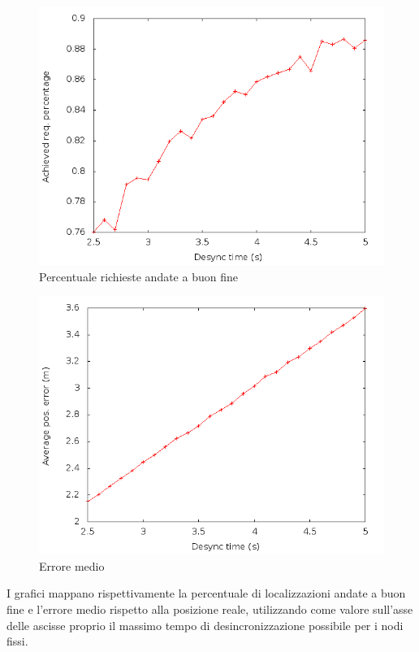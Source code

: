 \begin{figure}[H]
    \centering
    \includegraphics[scale=0.5]{achievedlochexagon6nodescutoff4req3preempt0droponepoint0speed1.png}
    \caption{Percentuale richieste andate a buon fine}
    \label{fig:my_label}
\end{figure}
\begin{figure}[H]
    \centering
    \includegraphics[scale=0.5]{avposerrorhexagon6nodescutoff4req3preempt0droponepoint0speed1.png}
    \caption{Errore medio}
    \label{fig:avposerrorhexagon6nodescutoff4req3preempt0droponepoint0speed1}
\end{figure}
I grafici mappano rispettivamente la percentuale di localizzazioni andate a buon fine e l'errore medio rispetto alla posizione reale, utilizzando come valore sull'asse delle ascisse proprio il massimo tempo di desincronizzazione possibile per i nodi fissi.\newline
